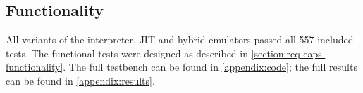 \subsection{Functionality}

All variants of the interpreter, JIT and hybrid emulators passed all 557 included tests. The functional tests were designed as described in \autoref{section:req-caps-functionality}. The full testbench can be found in \autoref{appendix:code}; the full results can be found in \autoref{appendix:results}.